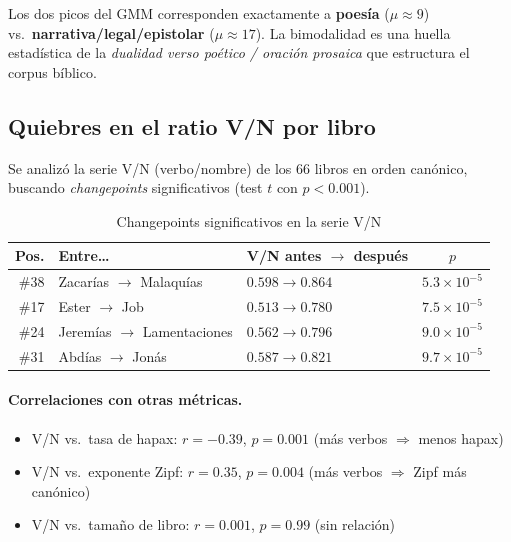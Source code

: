 \documentclass[12pt,a4paper]{article}
\begin{document}
Los dos picos del GMM corresponden exactamente a \textbf{poes\'ia} ($\mu \approx 9$) vs.\
\textbf{narrativa/legal/epistolar} ($\mu \approx 17$). La bimodalidad es una huella
estad\'istica de la \emph{dualidad verso po\'etico / oraci\'on prosaica} que estructura
el corpus b\'iblico.

\subsection{Quiebres en el ratio V/N por libro}

Se analiz\'o la serie V/N (verbo/nombre) de los 66 libros en orden can\'onico,
buscando \emph{changepoints} significativos (test $t$ con $p < 0.001$).

\begin{table}[H]
\centering
\caption{Changepoints significativos en la serie V/N}
\label{tab:changepoints}
\begin{tabular}{rllc}
\toprule
\textbf{Pos.} & \textbf{Entre\ldots} & \textbf{V/N antes $\to$ despu\'es} & \textbf{$p$} \\
\midrule
\#38 & Zacar\'ias $\to$ Malaqu\'ias       & $0.598 \to 0.864$ & $5.3 \times 10^{-5}$ \\
\#17 & Ester $\to$ Job                     & $0.513 \to 0.780$ & $7.5 \times 10^{-5}$ \\
\#24 & Jerem\'ias $\to$ Lamentaciones      & $0.562 \to 0.796$ & $9.0 \times 10^{-5}$ \\
\#31 & Abd\'ias $\to$ Jon\'as              & $0.587 \to 0.821$ & $9.7 \times 10^{-5}$ \\
\bottomrule
\end{tabular}
\end{table}

\paragraph{Correlaciones con otras m\'etricas.}
\begin{itemize}[leftmargin=2em]
\item V/N vs.\ tasa de hapax: $r = -0.39$, $p = 0.001$ (m\'as verbos $\Rightarrow$ menos hapax)
\item V/N vs.\ exponente Zipf: $r = 0.35$, $p = 0.004$ (m\'as verbos $\Rightarrow$ Zipf m\'as can\'onico)
\item V/N vs.\ tama\~no de libro: $r = 0.001$, $p = 0.99$ (sin relaci\'on)
\end{itemize}
\end{document}

